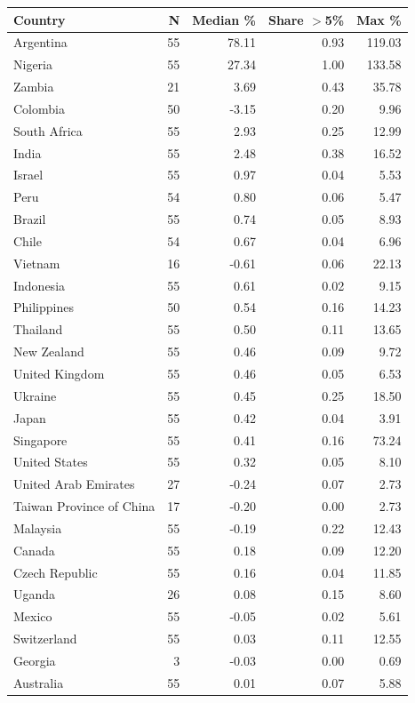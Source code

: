 \begin{tabular}{lrrrr}
\hline
Country & N & Median \% & Share $>$5\% & Max \% \\
\hline
Argentina & 55 & 78.11 & 0.93 & 119.03 \\
Nigeria & 55 & 27.34 & 1.00 & 133.58 \\
Zambia & 21 & 3.69 & 0.43 & 35.78 \\
Colombia & 50 & -3.15 & 0.20 & 9.96 \\
South Africa & 55 & 2.93 & 0.25 & 12.99 \\
India & 55 & 2.48 & 0.38 & 16.52 \\
Israel & 55 & 0.97 & 0.04 & 5.53 \\
Peru & 54 & 0.80 & 0.06 & 5.47 \\
Brazil & 55 & 0.74 & 0.05 & 8.93 \\
Chile & 54 & 0.67 & 0.04 & 6.96 \\
Vietnam & 16 & -0.61 & 0.06 & 22.13 \\
Indonesia & 55 & 0.61 & 0.02 & 9.15 \\
Philippines & 50 & 0.54 & 0.16 & 14.23 \\
Thailand & 55 & 0.50 & 0.11 & 13.65 \\
New Zealand & 55 & 0.46 & 0.09 & 9.72 \\
United Kingdom & 55 & 0.46 & 0.05 & 6.53 \\
Ukraine & 55 & 0.45 & 0.25 & 18.50 \\
Japan & 55 & 0.42 & 0.04 & 3.91 \\
Singapore & 55 & 0.41 & 0.16 & 73.24 \\
United States & 55 & 0.32 & 0.05 & 8.10 \\
United Arab Emirates & 27 & -0.24 & 0.07 & 2.73 \\
Taiwan Province of China & 17 & -0.20 & 0.00 & 2.73 \\
Malaysia & 55 & -0.19 & 0.22 & 12.43 \\
Canada & 55 & 0.18 & 0.09 & 12.20 \\
Czech Republic & 55 & 0.16 & 0.04 & 11.85 \\
Uganda & 26 & 0.08 & 0.15 & 8.60 \\
Mexico & 55 & -0.05 & 0.02 & 5.61 \\
Switzerland & 55 & 0.03 & 0.11 & 12.55 \\
Georgia & 3 & -0.03 & 0.00 & 0.69 \\
Australia & 55 & 0.01 & 0.07 & 5.88 \\
\hline
\end{tabular}
